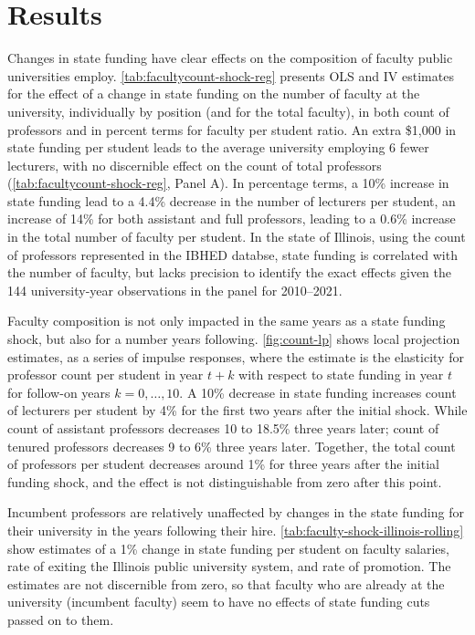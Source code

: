 \section{Results}
\label{sec:results}

Changes in state funding have clear effects on the composition of faculty public universities employ.
\autoref{tab:facultycount-shock-reg} presents OLS and IV estimates for the effect of a change in state funding on the number of faculty at the university, individually by position (and for the total faculty), in both count of professors and in percent terms for faculty per student ratio.
An extra \$1,000 in state funding per student leads to the average university employing 6 fewer lecturers, with no discernible effect on the count of total professors (\autoref{tab:facultycount-shock-reg}, Panel A).
In percentage terms, a 10\% increase in state funding lead to a 4.4\% decrease in the number of lecturers per student, an increase of 14\% for both assistant and full professors, leading to a 0.6\% increase in the total number of faculty per student.
In the state of Illinois, using the count of professors represented in the IBHED databse, state funding is correlated with the number of faculty, but lacks precision to identify the exact effects given the 144 university-year observations in the panel for 2010--2021.

Faculty composition is not only impacted in the same years as a state funding shock, but also for a number years following.
\autoref{fig:count-lp} shows local projection estimates, as a series of impulse responses, where the estimate is the elasticity for professor count per student in year $t+k$ with respect to state funding in year $t$ for follow-on years $k = 0, \hdots, 10$.
A 10\% decrease in state funding increases count of lecturers per student by 4\% for the first two years after the initial shock.
While count of assistant professors decreases 10 to 18.5\% three years later;
count of tenured professors decreases 9 to 6\% three years later.
Together, the total count of professors per student decreases around 1\% for three years after the initial funding shock, and the effect is not distinguishable from zero after this point.


Incumbent professors are relatively unaffected by changes in the state funding for their university in the years following their hire.
\autoref{tab:faculty-shock-illinois-rolling} show estimates of a 1\% change in state funding per student on faculty salaries, rate of exiting the Illinois public university system, and rate of promotion.
The estimates are not discernible from zero, so that faculty who are already at the university (incumbent faculty) seem to have no effects of state funding cuts passed on to them.

